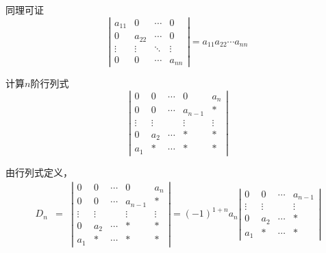 \documentclass[10pt,a4paper%
tablecaptionabove]{article}
\begin{document}
\begin{CJK}{UTF8}{gkai}
  同理可证
  $$
  \left|
    \begin{array}{cccc}
      a_{11}  &  0 & \cdots & 0 \\
      0  &  a_{22} & \cdots & 0 \\
      \vdots & \vdots & \ddots & \vdots\\  
      0  &  0 & \cdots & a_{nn} 
    \end{array}
  \right| = a_{11}a_{22}\cdots a_{nn}
  $$

  \begin{li}
    计算$n$阶行列式
    $$
    \left|
      \begin{array}{ccccc}
        0  &  0 & \cdots & 0 & a_n \\
        0  &  0 & \cdots & a_{n-1} & * \\
        \vdots & \vdots & & \vdots & \vdots\\  
        0  &  a_2 & \cdots & * & * \\
        a_1 & * & \cdots & * & *
      \end{array}
    \right| 
    $$
  \end{li}
  \begin{jie}
    由行列式定义，
    $$
    \begin{array}{rcl}
      D_n &=& \left|
              \begin{array}{ccccc}
                0  &  0 & \cdots & 0 & a_n \\
                0  &  0 & \cdots & a_{n-1} & * \\
                \vdots & \vdots & & \vdots & \vdots\\  
                0  &  a_2 & \cdots & * & * \\
                a_1 & * & \cdots & * & *
              \end{array}
                                       \right| =   (-1)^{1+n} a_n \left|
                                       \begin{array}{cccc}
                                         0  &  0 & \cdots &   a_{n-1} \\
                                         \vdots & \vdots &  & \vdots\\  
                                         0  &  a_2 & \cdots  & * \\
                                         a_1 & * & \cdots  & *
                                       \end{array} 
                                                             \right| \\

\end{array}$$
\end{jie}
\end{CJK}
\end{document}
